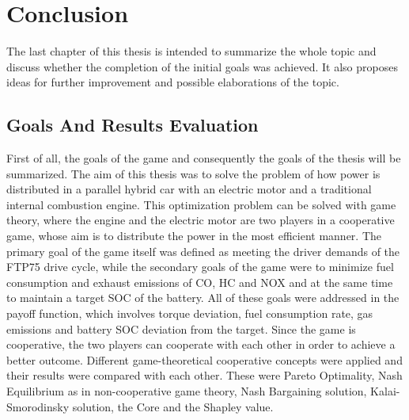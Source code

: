 \chapter{Conclusion}
\label{chp:conclusion}

The last chapter of this thesis is intended to summarize the whole topic and discuss whether the completion of the initial goals was achieved. It also proposes ideas for further improvement and possible elaborations of the topic.

\section{Goals And Results Evaluation}
First of all, the goals of the game and consequently the goals of the thesis will be summarized. The aim of this thesis was to solve the problem of how power is distributed in a parallel hybrid car with an electric motor and a traditional internal combustion engine. This optimization problem can be solved with game theory, where the engine and the electric motor are two players in a cooperative game, whose aim is to distribute the power in the most efficient manner. The primary goal of the game itself was defined as meeting the driver demands of the FTP75 drive cycle, while the secondary goals of the game were to minimize fuel consumption and exhaust emissions of CO, HC and NOX and at the same time to maintain a target SOC of the battery. All of these goals were addressed in the payoff function, which involves torque deviation, fuel consumption rate, gas emissions and battery SOC deviation from the target. Since the game is cooperative, the two players can cooperate with each other in order to achieve a better outcome. Different game-theoretical cooperative concepts were applied and their results were compared with each other. These were Pareto Optimality, Nash Equilibrium as in non-cooperative game theory, Nash Bargaining solution, Kalai-Smorodinsky solution, the Core and the Shapley value. 

